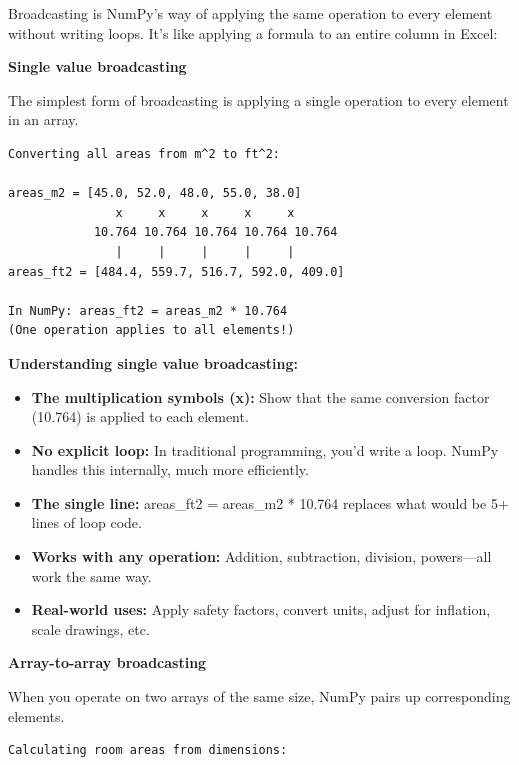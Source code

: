 Broadcasting is NumPy's way of applying the same operation to every element without writing loops. It's like applying a formula to an entire column in Excel:

\begin{tcolorbox}[
    title=Broadcasting visualized,
    colframe=purple,
    colback = white,
    arc=2mm,
    breakable
]
\textbf{Single value broadcasting}

The simplest form of broadcasting is applying a single operation to every element in an array.

\begin{lstlisting}[basicstyle=\ttfamily\footnotesize,breaklines=true,columns=fullflexible,keepspaces=true,xleftmargin=0pt]
Converting all areas from m^2 to ft^2:

areas_m2 = [45.0, 52.0, 48.0, 55.0, 38.0]
               x     x     x     x     x
            10.764 10.764 10.764 10.764 10.764
               |     |     |     |     |
areas_ft2 = [484.4, 559.7, 516.7, 592.0, 409.0]

In NumPy: areas_ft2 = areas_m2 * 10.764
(One operation applies to all elements!)
\end{lstlisting}

\textbf{Understanding single value broadcasting:}
\begin{itemize}
\item \textbf{The multiplication symbols (x):} Show that the same conversion factor (10.764) is applied to each element.
\item \textbf{No explicit loop:} In traditional programming, you'd write a loop. NumPy handles this internally, much more efficiently.
\item \textbf{The single line:} areas\_ft2 = areas\_m2 * 10.764 replaces what would be 5+ lines of loop code.
\item \textbf{Works with any operation:} Addition, subtraction, division, powers---all work the same way.
\item \textbf{Real-world uses:} Apply safety factors, convert units, adjust for inflation, scale drawings, etc.
\end{itemize}
\vspace{2em}

\textbf{Array-to-array broadcasting}

When you operate on two arrays of the same size, NumPy pairs up corresponding elements.

\begin{lstlisting}[basicstyle=\ttfamily\footnotesize,breaklines=true,columns=fullflexible,keepspaces=true,xleftmargin=0pt]
Calculating room areas from dimensions:


\end{lstlisting}
\end{tcolorbox}
